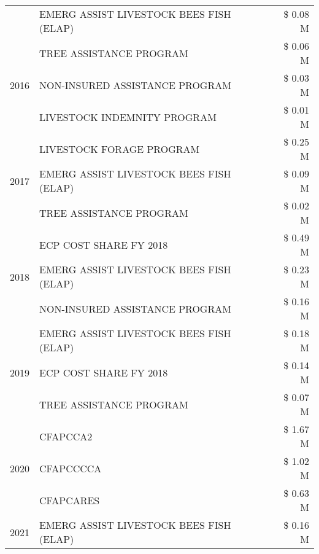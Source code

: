 \begin{tabular}{llr}
 & EMERG ASSIST LIVESTOCK BEES FISH (ELAP) & \$ 0.08 M \\
\cline{1-3}
\multirow[t]{3}{*}{2016} & TREE ASSISTANCE PROGRAM                       & \$ 0.06 M \\
 & NON-INSURED ASSISTANCE PROGRAM                & \$ 0.03 M \\
 & LIVESTOCK INDEMNITY PROGRAM                   & \$ 0.01 M \\
\cline{1-3}
\multirow[t]{3}{*}{2017} & LIVESTOCK FORAGE PROGRAM & \$ 0.25 M \\
 & EMERG ASSIST LIVESTOCK BEES FISH (ELAP) & \$ 0.09 M \\
 & TREE ASSISTANCE PROGRAM & \$ 0.02 M \\
\cline{1-3}
\multirow[t]{3}{*}{2018} & ECP COST SHARE FY 2018 & \$ 0.49 M \\
 & EMERG ASSIST LIVESTOCK BEES FISH (ELAP) & \$ 0.23 M \\
 & NON-INSURED ASSISTANCE PROGRAM & \$ 0.16 M \\
\cline{1-3}
\multirow[t]{3}{*}{2019} & EMERG ASSIST LIVESTOCK BEES FISH (ELAP) & \$ 0.18 M \\
 & ECP COST SHARE FY 2018 & \$ 0.14 M \\
 & TREE ASSISTANCE PROGRAM & \$ 0.07 M \\
\cline{1-3}
\multirow[t]{3}{*}{2020} & CFAPCCA2 & \$ 1.67 M \\
 & CFAPCCCCA & \$ 1.02 M \\
 & CFAPCARES & \$ 0.63 M \\
\cline{1-3}
2021 & EMERG ASSIST LIVESTOCK BEES FISH (ELAP) & \$ 0.16 M \\
\cline{1-3}
\bottomrule
\end{tabular}
